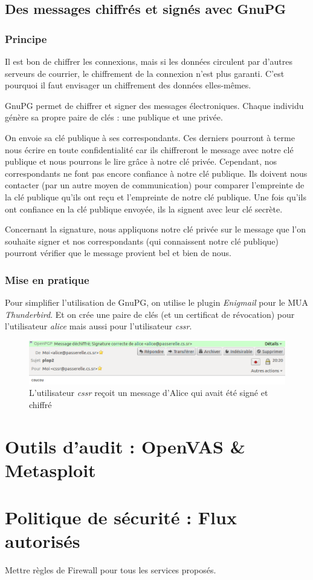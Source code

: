 \documentclass[a4paper]{article}
\begin{document}
\subsection{Des messages chiffrés et signés avec GnuPG}

\subsubsection{Principe}

Il est bon de chiffrer les connexions, mais si les données
circulent par d'autres serveurs de courrier, le chiffrement
de la connexion n'est plus garanti. C'est pourquoi il faut 
envisager un chiffrement des données elles-mêmes. 

GnuPG permet de chiffrer et signer des messages électroniques. 
Chaque individu génère sa propre paire de clés : une publique et une privée.

On envoie sa clé publique à ses correspondants. Ces derniers pourront à 
terme nous écrire en toute confidentialité car ils chiffreront le message 
avec notre clé publique et nous
pourrons le lire grâce à notre clé privée.
Cependant, nos correspondants ne font pas encore confiance à notre clé publique. 
Ils doivent nous contacter (par un autre moyen de 
communication) pour comparer l'empreinte de la clé publique qu'ils ont reçu et l'empreinte
de notre clé publique. Une fois qu'ils ont confiance en la clé publique envoyée,
ils la signent avec leur clé secrète. 


Concernant la signature, nous appliquons notre clé privée sur le message que l'on souhaite
signer et nos correspondants (qui connaissent notre clé publique) pourront
vérifier que le message provient bel et bien de nous.

\subsubsection{Mise en pratique}

Pour simplifier l'utilisation de GnuPG, on utilise le plugin \textit{Enigmail} pour le MUA
\textit{Thunderbird}. Et on crée une paire de clés (et un certificat de révocation)
pour l'utilisateur \textit{alice} mais aussi pour l'utilisateur \textit{cssr}.


\begin{figure}[!ht]
	\centering
	\includegraphics[scale=.5]{pgp.png}
	\caption{\label{pgp} L'utilisateur \textit{cssr} reçoit un message d'Alice qui avait été signé et chiffré}
\end{figure}

\section{Outils d'audit : OpenVAS \& Metasploit}

\section{Politique de sécurité : Flux autorisés}

Mettre règles de Firewall pour tous les services proposés.
\end{document}
